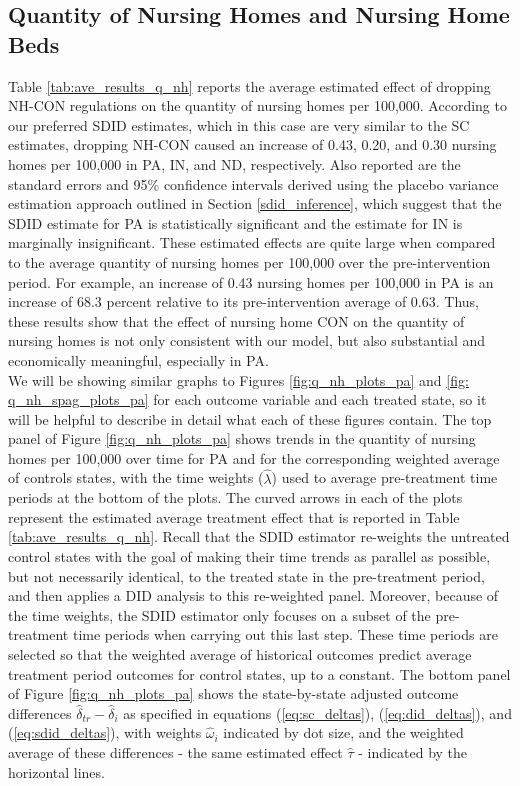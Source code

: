 \documentclass[../Main.tex]{subfiles}
\begin{document}
\subsection{Quantity of Nursing Homes and Nursing Home Beds}

\indent Table \ref{tab:ave_results_q_nh} reports the average estimated effect of dropping NH-CON regulations on the quantity of nursing homes per 100,000. According to our preferred SDID estimates, which in this case are very similar to the SC estimates, dropping NH-CON caused an increase of 0.43, 0.20, and 0.30 nursing homes per 100,000 in PA, IN, and ND, respectively. Also reported are the standard errors and 95\% confidence intervals derived using the placebo variance estimation approach outlined in Section \ref{sdid_inference}, which suggest that the SDID estimate for PA is statistically significant and the estimate for IN is marginally insignificant. These estimated effects are quite large when compared to the average quantity of nursing homes per 100,000 over the pre-intervention period. For example, an increase of 0.43 nursing homes per 100,000 in PA is an increase of 68.3 percent relative to its pre-intervention average of 0.63. Thus, these results show that the effect of nursing home CON on the quantity of nursing homes is not only consistent with our model, but also substantial and economically meaningful, especially in PA.  \\
\indent We will be showing similar graphs to Figures \ref{fig:q_nh_plots_pa} and \ref{fig: q_nh_spag_plots_pa} for each outcome variable and each treated state, so it will be helpful to describe in detail what each of these figures contain. The top panel of Figure \ref{fig:q_nh_plots_pa} shows trends in the quantity of nursing homes per 100,000 over time for PA and for the corresponding weighted average of controls states, with the time weights ($\hat{\lambda}$) used to average pre-treatment time periods at the bottom of the plots. The curved arrows in each of the plots represent the estimated average treatment effect that is reported in Table \ref{tab:ave_results_q_nh}. Recall that the SDID estimator re-weights the untreated control states with the goal of making their time trends as parallel as possible, but not necessarily identical, to the treated state in the pre-treatment period, and then applies a DID analysis to this re-weighted panel. Moreover, because of the time weights, the SDID estimator only focuses on a subset of the pre-treatment time periods when carrying out this last step. These time periods are selected so that the weighted average of historical outcomes predict average treatment period outcomes for control states, up to a constant. The bottom panel of Figure \ref{fig:q_nh_plots_pa} shows the state-by-state adjusted outcome differences $\hat{\delta}_{tr}-\hat{\delta}_i$ as specified in equations (\ref{eq:sc_deltas}), (\ref{eq:did_deltas}), and (\ref{eq:sdid_deltas}), with weights $\hat{\omega}_i$ indicated by dot size, and the weighted average of these differences - the same estimated effect $\hat{\tau}$ - indicated by the horizontal lines.\\
\end{document}
